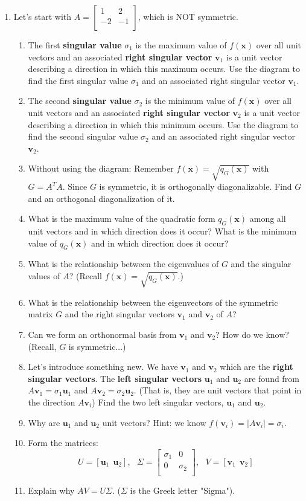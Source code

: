 \documentclass[12pt]{article}
\newcommand{\uvec}{{\mathbf u}}
\newcommand{\vvec}{{\mathbf v}}
\newcommand{\xvec}{{\mathbf x}}
\newcommand{\mattwo}[4]{\left[\begin{array}{rr}#1 & #2 \\ #3 & #4 \\ \end{array}\right]}
\begin{document}
\begin{enumerate}
    \item Let’s start with $A =\mattwo{1}{2}{-2}{-1}$, which is NOT symmetric. 

\begin{enumerate}
    \item The first {\bf{singular value}} $\sigma_1$
 is the maximum value of $f(\xvec)$
 over all unit vectors and an associated {\bf{right singular vector}} $\vvec_1$
 is a unit vector describing a direction in which this maximum occurs.
Use the diagram to find the first singular value $\sigma_1$
 and an associated right singular vector $\vvec_1$.
    \vfill

    \item The second {\bf{singular value}} $\sigma_2$
 is the minimum value of $f(\xvec)$
 over all unit vectors and an associated {\bf{right singular vector}} $\vvec_2$
 is a unit vector describing a direction in which this minimum occurs.
Use the diagram to find the second singular value $\sigma_2$
 and an associated right singular vector $\vvec_2$.
\vfill

\item Without using the diagram:  Remember $f(\xvec) = \sqrt{q_G(\xvec)}$ with $G=A^TA$.  Since $G$ is symmetric, it is orthogonally diagonalizable.  Find $G$ and an orthogonal diagonalization of it.
\vfill
\vfill
\newpage
\item What is the maximum value of the quadratic form $q_G(\xvec)$
 among all unit vectors and in which direction does it occur? What is the minimum value of $q_G(\xvec)$
 and in which direction does it occur?
\vfill

\item What is the relationship between the eigenvalues of $G$ and the singular values of $A$?  (Recall $f(\xvec)=\sqrt{q_G(\xvec)}$.)

\vfill
\item What is the relationship between the eigenvectors of the symmetric matrix $G$ and the right singular vectors $\vvec_1$ and $\vvec_2$ of $A$?  
\vfill
\item Can we form an orthonormal basis from $\vvec_1$ and $\vvec_2$?  How do we know? (Recall, $G$ is symmetric...)
\vfill 
\item Let's introduce something new.  We have $\vvec_1$ and $\vvec_2$ which are the {\bf{right singular vectors}}.  The {\bf{left singular vectors}} $\uvec_1$ and $\uvec_2$ are found from $A\vvec_1 = \sigma_1\uvec_1$ and $A\vvec_2 = \sigma_2\uvec_2$. (That is, they are unit vectors that point in the direction $A\vvec_i$) Find the two left singular vectors, $\uvec_1$ and $\uvec_2$.
\vfill
\item Why are $\uvec_1$ and $\uvec_2$ unit vectors?  Hint: we know $f(\vvec_i)=|A\vvec_i| = \sigma_i$.
\vfill
\newpage
\item Form the matrices:
$$U = \left[ \uvec_1 \ \ \uvec_2\right], \ \ \ \Sigma = \mattwo{\sigma_1}{0}{0}{\sigma_2}, \ \ \ V = \left[\vvec_1 \ \ \vvec_2\right]$$
\vfill
\item Explain why $AV = U\Sigma$.  ($\Sigma$ is the Greek letter "Sigma").
\vfill


\end{enumerate}
\end{enumerate}
\end{document}
